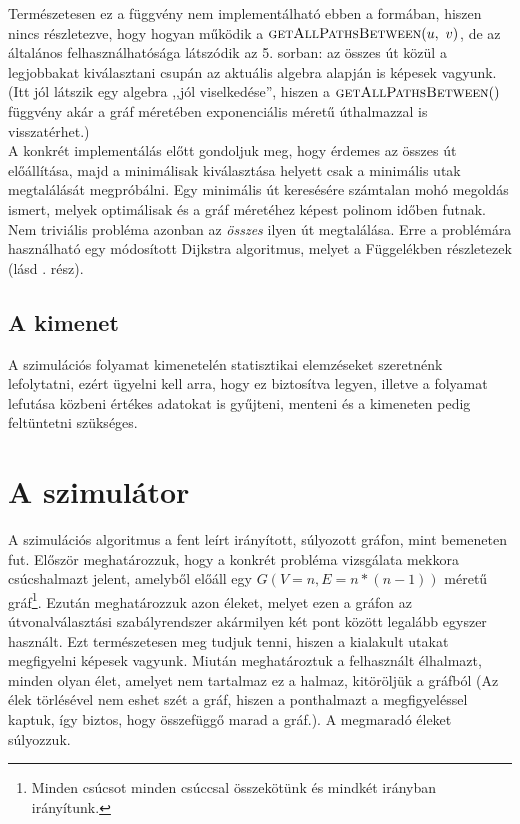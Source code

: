       Természetesen ez a függvény nem implementálható ebben a formában, hiszen nincs részletezve, hogy hogyan működik a $\Call{getAllPathsBetween}{u,~v}$, de az általános felhasználhatósága látszódik az 5. sorban: az összes út közül a legjobbakat kiválasztani csupán az aktuális algebra alapján is képesek vagyunk. (Itt jól látszik egy algebra ,,jól viselkedése'', hiszen a $\Call{getAllPathsBetween}$ függvény akár a gráf méretében exponenciális méretű úthalmazzal is visszatérhet.)\\

      A konkrét implementálás előtt gondoljuk meg, hogy érdemes az összes út előállítása, majd a minimálisak kiválasztása helyett csak a minimális utak megtalálását megpróbálni. Egy minimális út keresésére számtalan mohó megoldás ismert, melyek optimálisak és a gráf méretéhez képest polinom időben futnak. Nem triviális probléma azonban az \textit{összes} ilyen út megtalálása. Erre a problémára használható egy módosított Dijkstra algoritmus, melyet a Függelékben részletezek (lásd . rész).

    \subsection{A kimenet}
    A szimulációs folyamat kimenetelén statisztikai elemzéseket szeretnénk lefolytatni, ezért ügyelni kell arra, hogy ez biztosítva legyen, illetve a folyamat lefutása közbeni értékes adatokat is gyűjteni, menteni és a kimeneten pedig feltüntetni szükséges.

  \section{A szimulátor}\label{section_simulator}
  A szimulációs algoritmus a fent leírt irányított, súlyozott gráfon, mint bemeneten fut. Először meghatározzuk, hogy a konkrét probléma vizsgálata mekkora csúcshalmazt jelent, amelyből előáll egy $G(V=n, E=n*(n-1))$ méretű gráf\footnote{Minden csúcsot minden csúccsal összekötünk és mindkét irányban irányítunk.}. Ezután meghatározzuk azon éleket, melyet ezen a gráfon az útvonalválasztási szabályrendszer akármilyen két pont között legalább egyszer használt. Ezt természetesen meg tudjuk tenni, hiszen a kialakult utakat megfigyelni képesek vagyunk. Miután meghatároztuk a felhasznált élhalmazt, minden olyan élet, amelyet nem tartalmaz ez a halmaz, kitöröljük a gráfból (Az élek törlésével nem eshet szét a gráf, hiszen a ponthalmazt a megfigyeléssel kaptuk, így biztos, hogy összefüggő marad a gráf.). A megmaradó éleket súlyozzuk.\\

